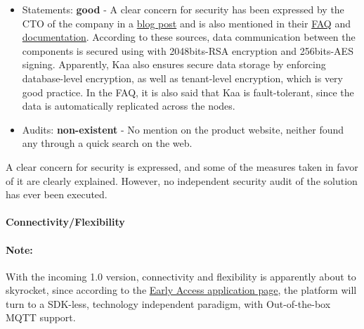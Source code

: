 \documentclass{article}
\begin{document}
\begin{itemize}
\item Statements: \textbf{good} - A clear concern for security has been expressed by the CTO of the company in a \href{https://www.kaaproject.org/lets-address-dark-side-iot-tackling-security-community/}{blog post} and is also mentioned in their \href{https://www.kaaproject.org/faq/}{FAQ} and \href{http://docs.kaaproject.org/display/KAA/Endpoint+registration#Endpointregistration-Registrationsecurity}{documentation}. According to these sources, data communication between the components is secured using with 2048bits-RSA encryption and 256bits-AES signing. Apparently, Kaa also ensures secure data storage by enforcing database-level encryption, as well as tenant-level encryption, which is very good practice. In the FAQ, it is also said that Kaa is fault-tolerant, since the data is automatically replicated across the nodes.
\item Audits: \textbf{non-existent} - No mention on the product website, neither found any through a quick search on the web.
\end{itemize}

A clear concern for security is expressed, and some of the measures taken in favor of it are clearly explained. However, no independent security audit of the solution has ever been executed.

\paragraph{Connectivity/Flexibility}

\paragraph{Note:} With the incoming 1.0 version, connectivity and flexibility is apparently about to skyrocket, since according to the \href{https://www.kaaproject.org/apply-for-early-access-to-kaa-1-0-banana-beach/}{Early Access application page}, the platform will turn to a SDK-less, technology independent paradigm, with Out-of-the-box MQTT support.
\end{document}
